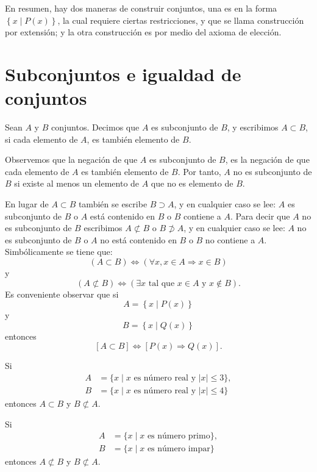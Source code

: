 En resumen, hay dos maneras de construir conjuntos, una es en la forma $\left\{x \mid P(x) \right\}$, la cual requiere ciertas restricciones, y que se llama construcción por extensión; y la otra construcción es por medio del axioma de elección.

\section{Subconjuntos e igualdad de conjuntos}

\begin{definicion}{}{}
    Sean $A$ y $B$ conjuntos. Decimos que $A$ es subconjunto de $B$, y escribimos $A \subset B$, si cada elemento de $A$, es también elemento de $B$.
\end{definicion}

Observemos que la negación de que $A$ es subconjunto de $B$, es la negación de que cada elemento de $A$ es también elemento de $B$. Por tanto, $A$ no es subconjunto de $B$ si existe al menos un elemento de $A$ que no es elemento de $B$.

En lugar de $A \subset B$ también se escribe $B \supset A$, y en cualquier caso se lee: $A$ es subconjunto de $B$ o $A$ está contenido en $B$ o $B$ contiene a $A$. Para decir que $A$ no es subconjunto de $B$ escribimos $A \not \subset B$ o $B \not \supset A$, y en cualquier caso se lee: $A$ no es subconjunto de $B$ o $A$ no está contenido en $B$ o $B$ no contiene a $A$. Simbólicamente se tiene que:
$$(A \subset B) \Longleftrightarrow (\forall x, x \in A \Longrightarrow x \in B)$$
y
$$(A \not \subset B) \Longleftrightarrow (\exists x \text{ tal que } x \in A \text{ y } x \notin B).$$
Es conveniente observar que si
$$A = \left\{ x \mid P(x) \right\}$$
y
$$B = \left\{ x \mid Q(x) \right\}$$
entonces
$$[A \subset B] \Longleftrightarrow [P(x) \Longrightarrow Q(x)].$$
\begin{examplebox}{}{}
    Si
    \begin{align*}
        A & = \{x \mid x \text { es número real y }|x| \leq 3\}, \\
        B & = \{x \mid x \text { es número real y }|x| \leq 4\}
    \end{align*}
    entonces $A \subset B$ y $B \not \subset A$.
\end{examplebox}

\newpage

\begin{examplebox}{}{}
    Si
    \begin{align*}
        A & = \{x \mid x \text { es número primo}\}, \\
        B & = \{x \mid x \text { es número impar}\}
    \end{align*}
    entonces $A \not \subset B$ y $B \not \subset A$.
\end{examplebox}

